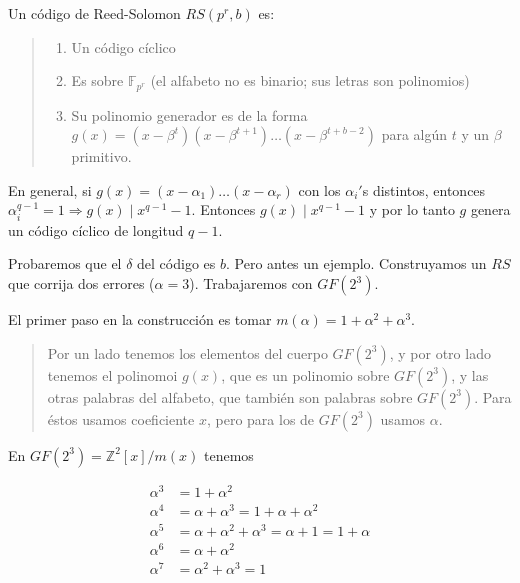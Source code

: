 \documentclass[a4paper]{article}
\begin{document}
\begin{definition}
    Un código de Reed-Solomon $RS(p^r, b)$ es: 

    
    \small
    \begin{quote}
    
    
    \begin{enumerate}
        \item Un código cíclico 
        \item Es sobre $\mathbb{F}_{p^r}$ (el alfabeto no es binario; sus letras son polinomios) 
        \item Su polinomio generador es de la forma $g(x) = (x-\beta^t)(x-\beta^{t+1})\ldots(x-\beta^{t+b-2})$ para 
            algún $t$ y un $\beta$ primitivo.
    \end{enumerate}
    
    \end{quote}
    \normalsize
    
\end{definition}

En general, si $g(x) = (x - \alpha_1)\ldots(x-\alpha_r)$ con los $\alpha_i'$s distintos,
entonces $\alpha_i^{q-1} = 1 \Rightarrow g(x) \mid x^{q-1} - 1$. Entonces $g(x) \mid x^{q - 1} - 1$
y por lo tanto $g$ genera un código cíclico de longitud $q - 1$.

Probaremos que el $\delta$ del código es $b$. Pero antes un ejemplo.
Construyamos un $RS$ que corrija dos errores ($\alpha = 3$).
Trabajaremos con $GF(2^3)$.

El primer paso en la construcción es tomar $m(\alpha) = 1 + \alpha^2 +
\alpha^3$. 


\small
\begin{quote}

Por un lado tenemos los elementos del cuerpo $GF(2^3)$, y por otro lado tenemos 
el polinomoi $g(x)$, que es un polinomio sobre $GF(2^3)$, y las otras palabras
del alfabeto, que también son palabras sobre $GF(2^3)$. Para éstos usamos coeficiente 
$x$, pero para los de $GF(2^3)$ usamos $\alpha$.

\end{quote}
\normalsize

En $GF(2^3) = \mathbb{Z}^2[x]/ m(x)$ tenemos 

\begin{align*}
    \alpha^3 &= 1 + \alpha^2\\ 
    \alpha^4 &= \alpha + \alpha^3 = 1 + \alpha + \alpha^2\\ 
    \alpha^5 &= \alpha+\alpha^2 + \alpha^3 = \alpha + 1 = 1 + \alpha \\ 
    \alpha^6 &= \alpha + \alpha^2 \\ 
    \alpha^7 &= \alpha^2 + \alpha^3 = 1
\end{align*}
\end{document}
